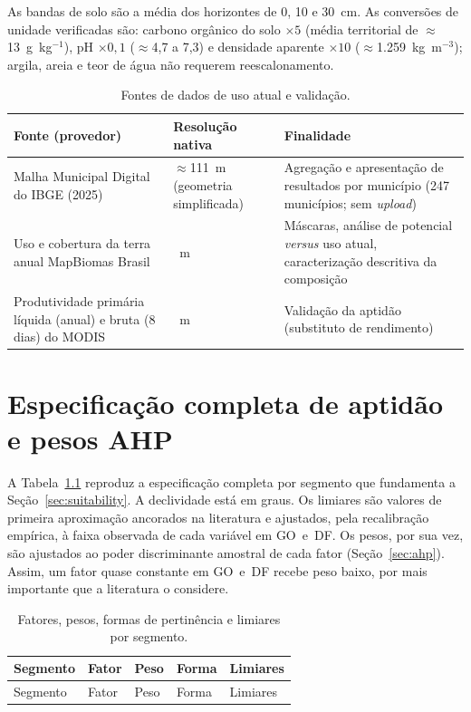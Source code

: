 As bandas de solo são a média dos horizontes de 0, 10 e 30~cm. As conversões de unidade verificadas
são: carbono orgânico do solo $\times 5$ (média territorial de $\approx$13~g~kg$^{-1}$), pH
$\times 0{,}1$ ($\approx$4,7 a 7,3) e densidade aparente $\times 10$ ($\approx$1.259~kg~m$^{-3}$);
argila, areia e teor de água não requerem reescalonamento.

\begin{table}[htbp]
\centering
\caption{Fontes de dados de uso atual e validação.}
\label{tab:src-realized}
\begin{tabular}{@{}>{\raggedright\arraybackslash}p{5cm}>{\raggedright\arraybackslash}p{2.7cm}>{\raggedright\arraybackslash}p{6cm}@{}}
\toprule
Fonte (provedor) & Resolução nativa & Finalidade \\
\midrule
Malha Municipal Digital do IBGE (2025) & $\approx$111~m (geometria simplificada) & Agregação e
  apresentação de resultados por município (247 municípios; sem \emph{upload}) \\
Uso e cobertura da terra anual MapBiomas Brasil & 30~m & Máscaras, análise de potencial
  \emph{versus} uso atual, caracterização descritiva da composição \\
Produtividade primária líquida (anual) e bruta (8 dias) do MODIS & 500~m & Validação da
  aptidão (substituto de rendimento) \\
\bottomrule
\end{tabular}
\end{table}

\chapter{Especificação completa de aptidão e pesos AHP}\label{anx:spec}

A Tabela~\ref{tab:spec-longtable} reproduz a especificação completa por segmento que fundamenta a
Seção~\ref{sec:suitability}. A declividade está em graus. Os limiares são valores de primeira
aproximação ancorados na literatura e ajustados, pela recalibração empírica, à faixa observada de cada
variável em GO~e~DF. Os pesos, por sua vez, são ajustados ao poder discriminante amostral de cada
fator (Seção~\ref{sec:ahp}). Assim, um fator quase constante em GO~e~DF recebe peso baixo, por mais
importante que a literatura o considere.

\begin{longtable}{@{}>{\raggedright\arraybackslash}p{2.6cm}>{\raggedright\arraybackslash}p{3.6cm}p{0.9cm}>{\raggedright\arraybackslash}p{1.9cm}>{\raggedright\arraybackslash}p{3.2cm}@{}}
\caption{Fatores, pesos, formas de pertinência e limiares por segmento.}\label{tab:spec-longtable} \\
\toprule
Segmento & Fator & Peso & Forma & Limiares \\
\midrule
\endfirsthead
\toprule
Segmento & Fator & Peso & Forma & Limiares \\
\midrule
\endhead
\end{longtable}

